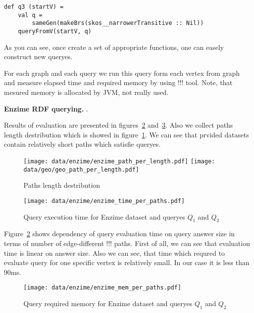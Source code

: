 \begin{lstlisting}
def q3 (startV) =
    val q =
        sameGen(makeBrs(skos__narrowerTransitive :: Nil))
    queryFromV(startV, q)
\end{lstlisting}

As you can see, once create a set of appropriate functions, one can easely construct new queryes.

For each graph and each query we run this query form each vertex from graph and measure elapsed time and required memory by using !!! tool.
Note, that mesured memory is allocated by JVM, not really used.


\textbf{Enzime RDF querying.} 
.

Results of evaluation are presented in figures~\ref{fig:enzime_time_per_paths} and~\ref{fig:enzime_mem_per_paths}.
Also we collect paths length destribution which is showed in figure~\ref{fig:pLength}.
We can see that prvided datasets contain relatively short paths which satisfie queryes.


\begin{figure}
\centering
    {\texttt{[image: data/enzime/enzime\_path\_per\_length.pdf]}}
{\texttt{[image: data/geo/geo\_path\_per\_length.pdf]}}
\caption{Paths length destribution}\label{fig:pLength}
\end{figure}

\begin{figure}[ht]
  \begin{center}
    \texttt{[image: data/enzime/enzime\_time\_per\_paths.pdf]}
    \caption{Query execution time for Enzime dataset and queryes $Q_1$ and $Q_2$}
    \label{fig:enzime_time_per_paths}
  \end{center}
\end{figure}

Figure~\ref{fig:enzime_time_per_paths} shows dependency of query evaluation time on query answer size in terms of number of edge-different !!! paths.
First of all, we can see that evaluation time is linear on answer size.
Also we can see, that time which requred to evaluate query for one specific vertex is relatively small.
In our case it is less than 90ms.

\begin{figure}[ht]
  \begin{center}
    \texttt{[image: data/enzime/enzime\_mem\_per\_paths.pdf]}
    \caption{Query required memory for Enzime dataset and queryes $Q_1$ and $Q_2$}
    \label{fig:enzime_mem_per_paths}
  \end{center}
\end{figure}

